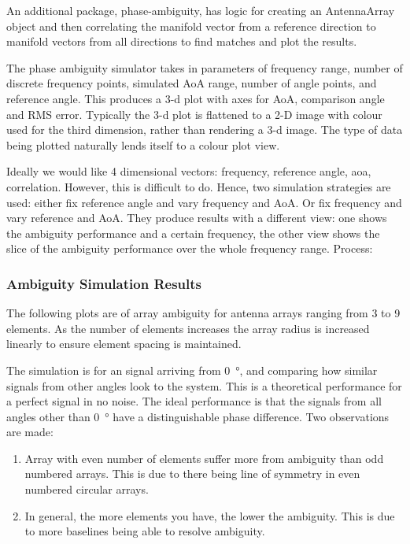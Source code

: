 An additional package, phase-ambiguity, has logic for creating an AntennaArray object and then correlating the manifold vector from a reference direction to manifold vectors from all directions to find matches and plot the results.

The phase ambiguity simulator takes in parameters of frequency range, number of discrete frequency points, simulated AoA range, number of angle points, and reference angle.
This produces a 3-d plot with axes for AoA, comparison angle and RMS error. Typically the 3-d plot is flattened to a 2-D image with colour used for the third dimension, rather than rendering a 3-d image. The type of data being plotted naturally lends itself to a colour plot view.


Ideally we would like 4 dimensional vectors: frequency, reference angle, aoa, correlation. However, this is difficult to do. Hence, two simulation strategies are used: either fix reference angle and vary frequency and AoA. Or fix frequency and vary reference and AoA. They produce results with a different view: one shows the ambiguity performance and a certain frequency, the other view shows the slice of the ambiguity performance over the whole frequency range. Process:

\subsubsection{Ambiguity Simulation Results}
The following plots are of array ambiguity for antenna arrays ranging from 3 to 9 elements. As the number of elements increases the array radius is increased linearly to ensure element spacing is maintained.

The simulation is for an signal arriving from \SI{0}{\degree}, and comparing how similar signals from other angles look to the system. This is a theoretical performance for a perfect signal in no noise. The ideal performance is that the signals from all angles other than \SI{0}{\degree} have a distinguishable phase difference. Two observations are made:
\begin{enumerate}
  \item Array with even number of elements suffer more from ambiguity than odd numbered arrays. This is due to there being line of symmetry in even numbered circular arrays.
  \item In general, the more elements you have, the lower the ambiguity. This is due to more baselines being able to resolve ambiguity.
\end{enumerate}


